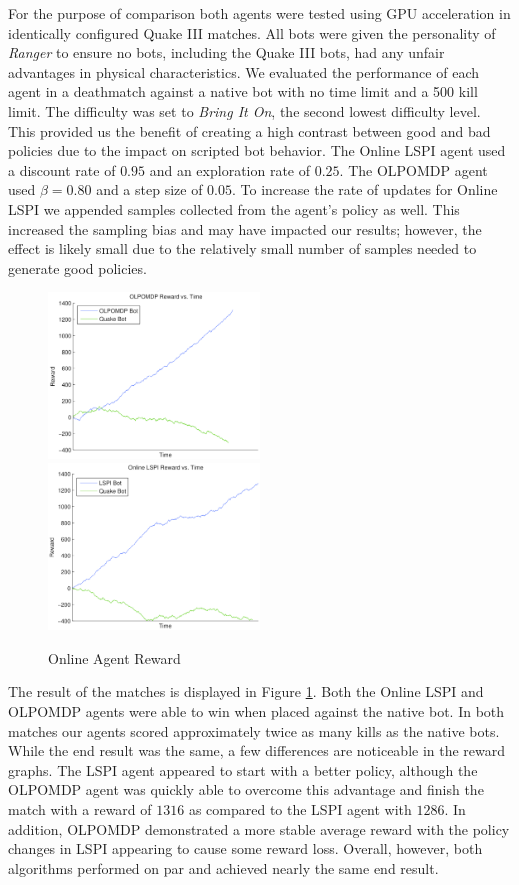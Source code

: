 For the purpose of comparison both agents were tested using GPU acceleration in identically configured Quake III matches. All bots were given the personality of \emph{Ranger} to ensure no bots, including the Quake III bots, had any unfair advantages in physical characteristics. We evaluated the performance of each agent in a deathmatch against a native bot with no time limit and a 500 kill limit. The difficulty was set to \emph{Bring It On}, the second lowest difficulty level. This provided us the benefit of creating a high contrast between good and bad policies due to the impact on scripted bot behavior. The Online LSPI agent used a discount rate of $0.95$ and an exploration rate of $0.25$. The OLPOMDP agent used $\beta = 0.80$ and a step size of $0.05$. To increase the rate of updates for Online LSPI we appended samples collected from the agent's policy as well. This increased the sampling bias and may have impacted our results; however, the effect is likely small due to the relatively small number of samples needed to generate good policies.

\begin{figure}
		\includegraphics[width=0.5\textwidth]{OLPOMDP_Reward_vs_Time.png}
        \includegraphics[width=0.5\textwidth]{LSPI_Reward_vs_Time.png}
	\label{fig:online:reward}
    \caption{Online Agent Reward}
\end{figure}

The result of the matches is displayed in Figure \ref{fig:online:reward}. Both the Online LSPI and OLPOMDP agents were able to win when placed against the native bot. In both matches our agents scored approximately twice as many kills as the native bots. While the end result was the same, a few differences are noticeable in the reward graphs. The LSPI agent appeared to start with a better policy, although the OLPOMDP agent was quickly able to overcome this advantage and finish the match with a reward of $1316$ as compared to the LSPI agent with $1286$. In addition, OLPOMDP demonstrated a more stable average reward with the policy changes in LSPI appearing to cause some reward loss. Overall, however, both algorithms performed on par and achieved nearly the same end result.

